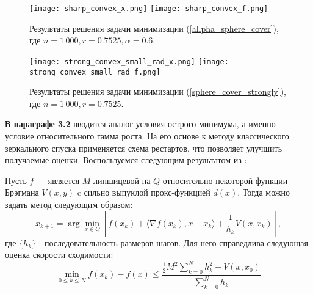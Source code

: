 \begin{figure}[h]
    \texttt{[image: sharp\_convex\_x.png]}
    \endminipage\hfill
    \texttt{[image: sharp\_convex\_f.png]}
    \endminipage\hfill
    \caption{ Результаты решения задачи минимизации (\ref{allpha_sphere_cover}), где  $n= 1\,000, r = 0.7525, \alpha = 0.6$.}
    \label{res_sharp_convex}
\end{figure}

\begin{figure}[h]
    \texttt{[image: strong\_convex\_small\_rad\_x.png]}
    \endminipage\hfill
    \texttt{[image: strong\_convex\_small\_rad\_f.png]}
    \endminipage\hfill
    \caption{ Результаты решения задачи минимизации (\ref{sphere_cover_strongly}), где  $n= 1\,000, r = 0.7525$.}
    \label{res_strong_convex}
\end{figure}


\underline{\textbf{В параграфе 3.2}} вводится аналог условия острого минимума, а именно - условие относительного гамма роста. На его основе к методу классического зеркального спуска применяется схема рестартов, что позволяет улучшить получаемые оценки.
Воспользуемся следующим результатом из \cite{Lu_2018}:
\begin{theorem} \label{vanilla_mirror}
    Пусть $f$ --- является $M$-липшицевой на $Q$ относительно некоторой функции Брэгмана $V(x, y)$ c сильно выпуклой прокс-функцией $d(x)$. Тогда можно задать метод следующим образом:
    \begin{equation} \label{mirr_upd}
        x_{k+1} = \arg \min_{x \in Q} {\left[ f(x_k) + \langle \nabla f(x_k), x - x_k \rangle + \frac{1}{h_k} V(x, x_k)\right]},
    \end{equation}
    где $\{ h_k \}$ - последовательность размеров шагов.
    Для него справедлива следующая оценка скорости сходимости:
    \begin{equation} \label{general_est}
        \min_{0\leq k \leq N} f(x_k) - f(x) \leq \frac{\frac{1}{2} M^2 \sum_{k=0}^N h_k^2 + V(x, x_0)}{\sum_{k=0}^N h_k}
    \end{equation}
\end{theorem}

